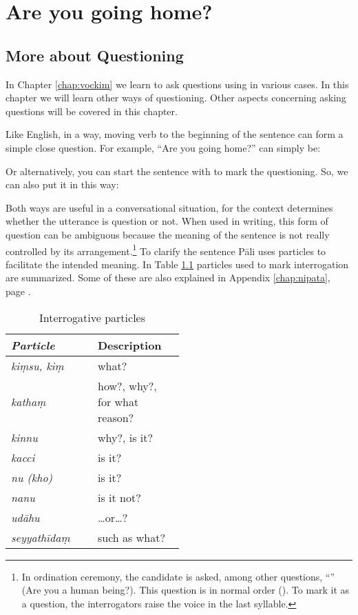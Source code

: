\chapter{Are you going home?}\label{chap:ques}

{}
\section*{More about Questioning}

In Chapter \ref{chap:vockim} we learn to ask questions using  in various cases. In this chapter we will learn other ways of questioning. Other aspects concerning asking questions will be covered in this chapter. 

Like English, in a way, moving verb to the beginning of the sentence can form a simple close question. For example, ``Are you going home?'' can simply be:


Or alternatively, you can start the sentence with  to mark the questioning. So, we can also put it in this way:


Both ways are useful in a conversational situation, for the context determines whether the utterance is question or not. When used in writing, this form of question can be ambiguous because the meaning of the sentence is not really controlled by its arrangement.\footnote{In ordination ceremony, the candidate is asked, among other questions, ``'' (Are you a human being?). This question is in normal order (). To mark it as a question, the interrogators raise the voice in the last syllable.} To clarify the sentence P\=ali uses particles to facilitate the intended meaning. In Table \ref{tab:indques} particles used to mark interrogation are summarized. Some of these are also explained in Appendix \ref{chap:nipata}, page \pageref{nip:ques}.

\begin{table}[!hbt]
\centering
\caption{Interrogative particles}
\label{tab:indques}
\bigskip
\begin{tabular}{>{\itshape}lp{0.5\linewidth}} \toprule
\bfseries\upshape Particle & \bfseries Description \\ \midrule
ki\d msu, ki\d m & what? \\
katha\d m & how?, why?, for what reason? \\
kinnu & why?, is it? \\
kacci & is it? \\
nu (kho) & is it? \\
nanu & is it not? \\
ud\=ahu & \ldots or\ldots? \\
seyyath\=ida\d m & such as what? \\
\bottomrule
\end{tabular}
\end{table}

